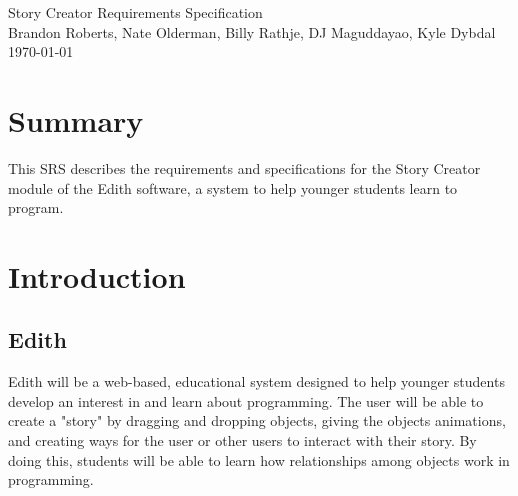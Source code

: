 \documentclass[12pt]{article}
\begin{document}

\begin{titlepage}
	\vspace*{\fill} %
	\begin{center}
		{\Huge Story Creator Requirements Specification}\\ [0.5cm]	%
		{\Large Brandon Roberts, Nate Olderman, Billy Rathje, DJ Maguddayao, Kyle Dybdal}\\[0.4cm]
		\today %
	\end{center}
	\vspace*{\fill}
\end{titlepage}

\section{Summary}
This SRS describes the requirements and specifications for the Story Creator module of the Edith software, a system to help younger students learn to program.


\section{Introduction}%
	\subsection{Edith}
	Edith will be a web-based, educational system designed to help younger students develop an interest in and learn about programming. The user will be able to create a "story" by dragging and dropping objects, giving the objects animations, and creating ways for the user or other users to interact with their story. By doing this, students will be able to learn how relationships among objects work in programming.
\end{document}
